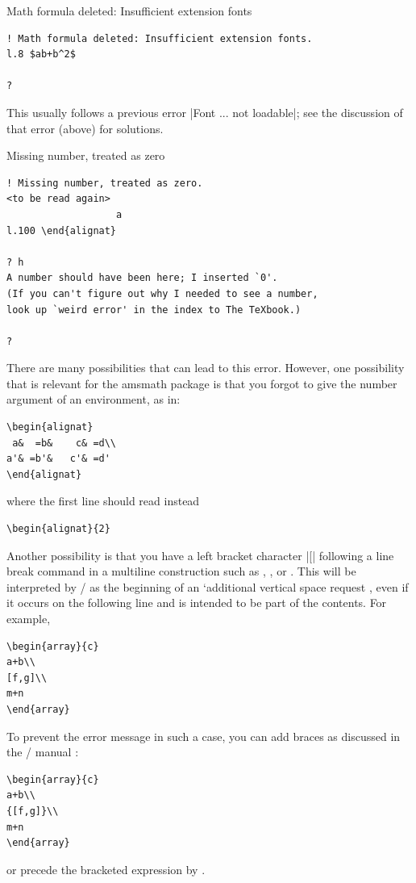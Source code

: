 \documentclass[leqno,titlepage,openany]{amsldoc}[1999/12/13]
\makeatletter
\newcommand{\nipkg}{\textsf}
\let\oldcs\cs
\def\cs#1{\texorpdfstring{\oldcs{#1}}{\@backslashchar\@backslashchar#1}}
\let\cn\cs
\makeatother
\begin{document}
\begin{error}{Math formula deleted: Insufficient extension fonts}
\errexa
\begin{verbatim}
! Math formula deleted: Insufficient extension fonts.
l.8 $ab+b^2$

?
\end{verbatim}
\errexpl
This usually follows a previous error |Font ... not loadable|; see the
discussion of that error (above) for solutions.
\end{error}

\enlargethispage{1\baselineskip}
\begin{error}{Missing number, treated as zero}
\errexa
\begin{verbatim}
! Missing number, treated as zero.
<to be read again>
                   a
l.100 \end{alignat}

? h
A number should have been here; I inserted `0'.
(If you can't figure out why I needed to see a number,
look up `weird error' in the index to The TeXbook.)

?
\end{verbatim}
\errexpl
There are many possibilities that can lead to this error. However, one
possibility that is relevant for the \nipkg{amsmath} package is that you
forgot to give the number argument of an  environment, as
in:
\begin{verbatim}
\begin{alignat}
 a&  =b&    c& =d\\
a'& =b'&   c'& =d'
\end{alignat}
\end{verbatim}
where the first line should read instead
\begin{verbatim}
\begin{alignat}{2}
\end{verbatim}

Another possibility is that you have a left bracket character |[|
following a line break command \cn{\\} in a multiline
construction such as , , or .
This will be interpreted by \latex/ as the beginning of an `additional
vertical space request \cite[\S C.1.6]{lamport}, even if it occurs on the
following line and is intended to be part of the contents. For example,
\begin{verbatim}
\begin{array}{c}
a+b\\
[f,g]\\
m+n
\end{array}
\end{verbatim}
To prevent the error message in such a case, you can
add braces as discussed in the \latex/ manual \cite[\S C.1.1]{lamport}:
\begin{verbatim}
\begin{array}{c}
a+b\\
{[f,g]}\\
m+n
\end{array}
\end{verbatim}
or precede the bracketed expression by \cn{relax}.
\end{error}
\end{document}
